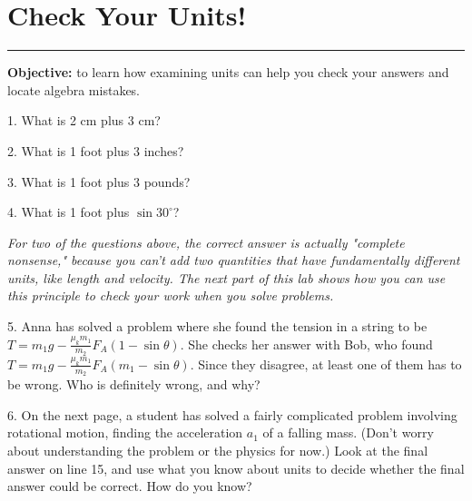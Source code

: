 \section{Check Your Units!}

\makelabheader %
\rule{1.0in}{0.1pt}

\vspace{0.1in}
\textbf{Objective:} to learn how examining units can help you check your answers and locate algebra mistakes. 
\vspace{0.2in}

1. What is 2 cm plus 3 cm?
\vspace{0.3in}

2. What is 1 foot plus 3 inches?
\vspace{0.3in}

3. What is 1 foot plus 3 pounds?
\vspace{0.3in}

4. What is 1 foot plus $\sin 30 ^\circ $?
\vspace{0.3in}

\textit{For two of the questions above, the correct answer is actually "complete nonsense," because you can't add two quantities that have fundamentally different units, like length and velocity.  The next part of this lab shows how you can use this principle to check your work when you solve problems.}

5. Anna has solved a problem where she found the tension in a string to be $T = m_1g - \frac{\mu_k m_1}{m_2} F_A (1 - \sin\theta)$.  She checks her answer with Bob, who found $T = m_1g - \frac{\mu_k m_1}{m_2} F_A (m_1 - \sin\theta)$. Since they disagree, at least one of them has to be wrong.  Who is definitely wrong, and why?
\vspace{0.7in}

6. On the next page, a student has solved a fairly complicated problem involving rotational motion, finding the acceleration $a_1$ of a falling mass. (Don't worry about understanding the problem or the physics for now.)  Look at the final answer on line 15, and use what you know about units to decide whether the final answer could be correct.  How do you know?
\vspace{0.7in}

